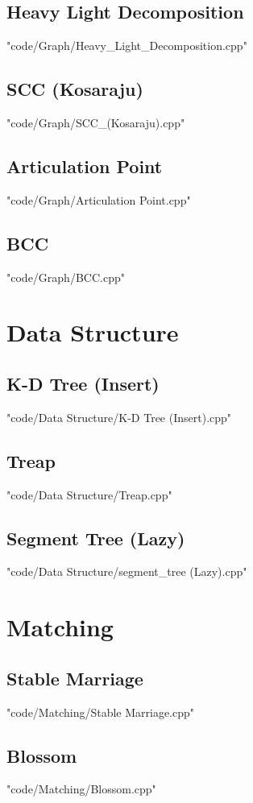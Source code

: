 \documentclass [landscape,8pt,a4paper,twocolumn]{article}
\begin{document}
\subsection{Heavy Light Decomposition}
 {"code/Graph/Heavy_Light_Decomposition.cpp"}
\subsection{SCC (Kosaraju)}
 {"code/Graph/SCC_(Kosaraju).cpp"}
\subsection{Articulation Point}
 {"code/Graph/Articulation Point.cpp"}
\subsection{BCC}
 {"code/Graph/BCC.cpp"}
\section{Data Structure}
\subsection{K-D Tree (Insert)}
 {"code/Data Structure/K-D Tree (Insert).cpp"}
\subsection{Treap}
 {"code/Data Structure/Treap.cpp"}
\subsection{Segment Tree (Lazy)}
 {"code/Data Structure/segment_tree (Lazy).cpp"}
\section{Matching}
\subsection{Stable Marriage}
 {"code/Matching/Stable Marriage.cpp"}
\subsection{Blossom}
 {"code/Matching/Blossom.cpp"}
\end{document}

